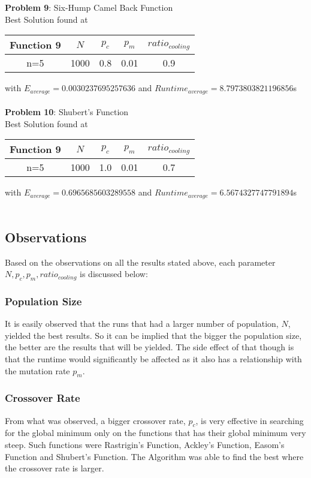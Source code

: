 \documentclass{article}
\begin{document}
\textbf{Problem 9}: Six-Hump Camel Back Function\\
Best Solution found at\\
\begin{center}
\begin{tabular}{ |c|c|c|c|c| } 
\hline
Function 9 & $N$ & $p_c$ & $p_m$ & $ratio_{cooling}$ \\
\hline
\multirow{1}{3em}{n=5}
& 1000 & 0.8 & 0.01 & 0.9 \\
\hline
\end{tabular}
\end{center}
with $E_{average} = 0.0030237695257636$ and $Runtime_{average} = 8.7973803821196856$s\\\\

\textbf{Problem 10}: Shubert's Function\\
Best Solution found at\\
\begin{center}
\begin{tabular}{ |c|c|c|c|c| } 
\hline
Function 9 & $N$ & $p_c$ & $p_m$ & $ratio_{cooling}$ \\
\hline
\multirow{1}{3em}{n=5}
& 1000 & 1.0 & 0.01 & 0.7 \\
\hline
\end{tabular}
\end{center}
with $E_{average} = 0.6965685603289558$ and $Runtime_{average} = 6.5674327747791894$s\\\\

\subsection{Observations}
Based on the observations on all the results stated above, each parameter $N, p_c, p_m, ratio_{cooling}$ is discussed below:
\subsubsection{Population Size}
It is easily observed that the runs that had a larger number of population, $N$, yielded the best results. So it can be implied that the bigger the population size, the better are the results that will be yielded. The side effect of that though is that the runtime would significantly be affected as it also has a relationship with the mutation rate $p_m$.

\subsubsection{Crossover Rate}
From what was observed, a bigger crossover rate, $p_c$, is very effective in searching for the global minimum only on the functions that has their global minimum very steep. Such functions were Rastrigin's Function, Ackley's Function, Easom's Function and Shubert's Function. The Algorithm was able to find the best where the crossover rate is larger.
\end{document}
